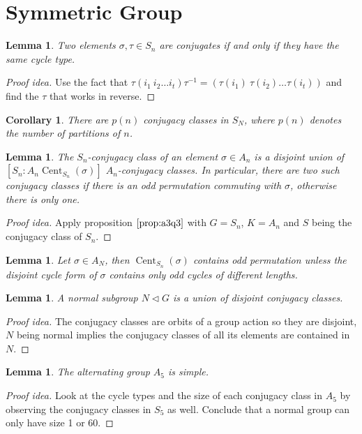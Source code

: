 \documentclass[paper=a4, fontsize=12pt]{scrartcl} %
\newtheorem{cor}[thm]{Corollary}
\newtheorem{lem}[thm]{Lemma}
\theoremstyle{definition}
\theoremstyle{remark}
\DeclareMathOperator{\cent}{Cent}
\numberwithin{equation}{section} %
\numberwithin{figure}{section} %
\numberwithin{table}{section} %
\begin{document}
\section{Symmetric Group}
\begin{lem}
	Two elements $\sigma, \tau \in S_n$ are conjugates if and only if they have the same cycle type.
\end{lem}
\begin{proof}[Proof idea]
	Use the fact that $\tau(i_1\ i_2\dots i_t)\tau^{-1} = (\tau(i_1)\ \tau(i_2)\dots \tau(i_t))$ and find the $\tau$ that works in reverse.
\end{proof}
\begin{cor}
	There are $p(n)$ conjugacy classes in $S_N$, where $p(n)$ denotes the number of partitions of $n$.
\end{cor}
\begin{lem}
	The $S_n$-conjugacy class of an element $\sigma \in A_n$ is a disjoint union of $[S_n : A_n \cent_{S_n}(\sigma)]$ $A_n$-conjugacy classes. In particular, there are two such conjugacy classes if there is an odd permutation commuting with $\sigma$, otherwise there is only one.
\end{lem}
\begin{proof}[Proof idea]
	Apply proposition $\ref{prop:a3q3}$ with $G= S_n$, $K = A_n$ and $S$ being the conjugacy class of $S_n$.
\end{proof}
\begin{lem}
	Let $\sigma \in A_N$, then $\cent_{S_n}(\sigma)$ contains odd permutation unless the disjoint cycle form of $\sigma$ contains only odd cycles of different lengths.
\end{lem}
\begin{lem}
	A normal subgroup $N \lhd G$ is a union of disjoint conjugacy classes.
\end{lem}
\begin{proof}[Proof idea]
	The conjugacy classes are orbits of a group action so they are disjoint, $N$ being normal implies the conjugacy classes of all its elements are contained in $N$.
\end{proof}
\begin{lem}
	The alternating group $A_5$ is simple.
\end{lem}
\begin{proof}[Proof idea]
	Look at the cycle types and the size of each conjugacy class in $A_5$ by observing the conjugacy classes in $S_5$ as well. Conclude that a normal group can only have size 1 or 60.
\end{proof}
\end{document}

